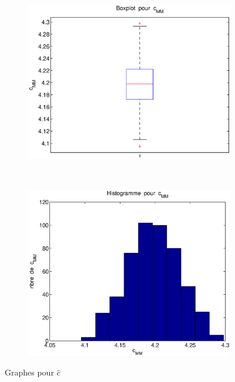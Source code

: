 \begin{figure}[!ht]
        \centering
        \begin{subfigure}[b]{0.5\textwidth}
                \includegraphics[width=\textwidth]{graphes/boxplot_cmm.eps}
        \end{subfigure}%
        ~
        \begin{subfigure}[b]{0.5\textwidth}
                \includegraphics[width=\textwidth]{graphes/hist_cmm.eps}
        \end{subfigure}
        \caption{Graphes pour $\hat{c}$}\label{fig:cmm}
\end{figure}

